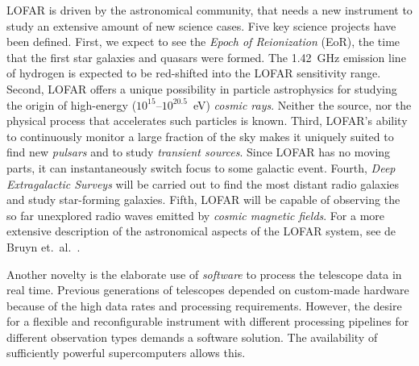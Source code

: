 \documentclass{sig-alternate}
\begin{document}
LOFAR is driven by the astronomical community, that needs a new instrument
to study an extensive amount of new science cases.
Five key science projects have been defined.
First, we expect to see the \emph{Epoch of Reionization\/} (EoR), the time
that the first star galaxies and quasars were formed.
The 1.42~GHz emission line of hydrogen is expected to be
red-shifted into the LOFAR sensitivity range.
Second, LOFAR offers a unique possibility in particle astrophysics for
studying the origin of high-energy ($10^{15}$--$10^{20.5}$~eV)
\emph{cosmic rays}.
Neither the source, nor the physical process that accelerates such particles
is known.
Third, LOFAR's ability to continuously monitor a large fraction of the sky
makes it uniquely suited to find new \emph{pulsars} and to study \emph{transient sources}.
Since LOFAR has no moving parts, it can instantaneously switch focus to
some galactic event.
Fourth, \emph{Deep Extragalactic Surveys\/} will be carried out to find the
most distant radio galaxies and study star-forming galaxies.
Fifth, LOFAR will be capable of observing the so far unexplored radio
waves emitted by \emph{cosmic magnetic fields}.
For a more extensive description of the astronomical aspects of the LOFAR
system, see de Bruyn et.~al.~\cite{Bruyn:02}.

Another novelty is the elaborate use of \emph{software\/} to process
the telescope data in real time.
Previous generations of telescopes depended on custom-made hardware
because of the high data rates and processing requirements.
However, the desire for a flexible and reconfigurable instrument with
different processing pipelines for different observation types demands a
software solution.
The availability of sufficiently powerful supercomputers allows this.
\end{document}
